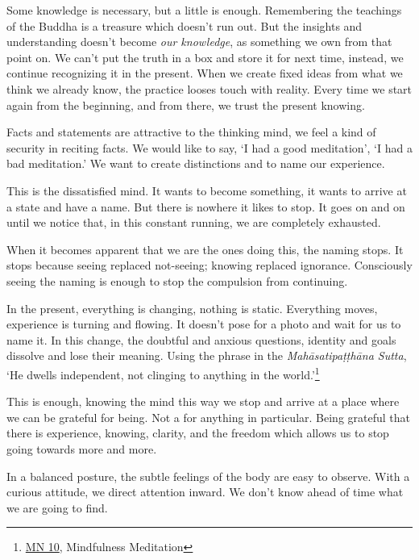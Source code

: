 
Some knowledge is necessary, but a little is enough. Remembering the
teachings of the Buddha is a treasure which doesn't run out. But the
insights and understanding doesn't become \emph{our knowledge}, as
something we own from that point on. We can't put the truth in a box and
store it for next time, instead, we continue recognizing it in the
present. When we create fixed ideas from what we think we already know,
the practice looses touch with reality. Every time we start again from
the beginning, and from there, we trust the present knowing.

Facts and statements are attractive to the thinking mind, we feel a kind
of security in reciting facts. We would like to say, `I had a good
meditation', `I had a bad meditation.' We want to create distinctions
and to name our experience.

This is the dissatisfied mind. It wants to become something, it wants to
arrive at a state and have a name. But there is nowhere it likes to
stop. It goes on and on until we notice that, in this constant running,
we are completely exhausted.

When it becomes apparent that we are the ones doing this, the naming
stops. It stops because seeing replaced not-seeing; knowing replaced
ignorance. Consciously seeing the naming is enough to stop the
compulsion from continuing.

In the present, everything is changing, nothing is static. Everything
moves, experience is turning and flowing. It doesn't pose for a photo
and wait for us to name it. In this change, the doubtful and anxious
questions, identity and goals dissolve and lose their meaning. Using the
phrase in the \emph{Mahāsatipaṭṭhāna Sutta}, `He dwells independent, not
clinging to anything in the world.'\footnote{\href{https://suttacentral.net/mn10}{MN
  10}, Mindfulness Meditation}

This is enough, knowing the mind this way we stop and arrive at a place
where we can be grateful for being. Not a for anything in particular.
Being grateful that there is experience, knowing, clarity, and the
freedom which allows us to stop going towards more and more.


In a balanced posture, the subtle feelings of the body are easy to
observe. With a curious attitude, we direct attention inward. We don't
know ahead of time what we are going to find.

